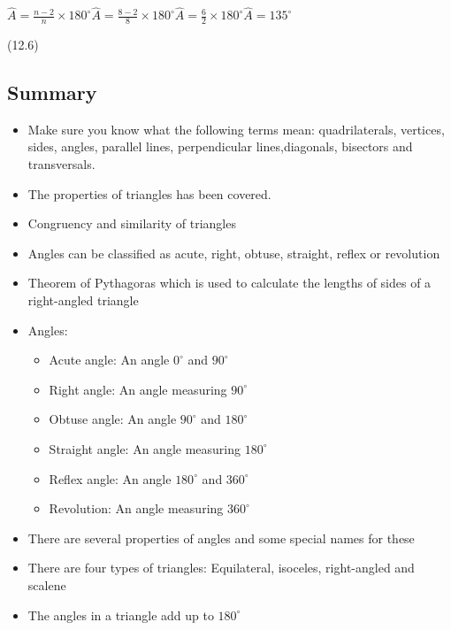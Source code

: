{\begin{mdframed}[linewidth=4, leftmargin=40, rightmargin=40]
\begin{exercise}
\begin{enumerate}[noitemsep, label=\textbf{Step} \textbf{\arabic*}. ]
{\begin{minipage}{\columnwidth}
    \parbox[t]{\mymathboxwidth}{\large$
    \hat{A}=\frac{n-2}{n}\ensuremath{\times}{180}^{\circ }\hat{A}=\frac{8-2}{8}\ensuremath{\times}{180}^{\circ }\hat{A}=\frac{6}{2}\ensuremath{\times}{180}^{\circ }\hat{A}={135}^{\circ }$}\hfill
    \parbox[t]{48pt}{\raggedleft 
    (12.6)}
    \end{minipage}\vspace{12pt}\par
    }%
\end{enumerate}
    \end{exercise}
    \end{mdframed}
    }
    \noindent
    \label{m39368*eip-514}
            \subsection{ Summary}
            \nopagebreak
            \label{m39368*eip-439}\begin{itemize}[noitemsep]
            \item Make sure you know what the following terms mean: quadrilaterals, vertices, sides, angles, parallel lines, perpendicular lines,diagonals, bisectors and transversals.\item The properties of triangles has been covered.\item Congruency and similarity of triangles\item Angles can be classified as acute, right, obtuse, straight, reflex or revolution\item Theorem of Pythagoras which is used to calculate the lengths of sides of a right-angled triangle\item Angles: \label{m39368*id98732}\begin{itemize}[noitemsep]
            \item Acute angle: An angle ${0}^{\circ }$ and ${90}^{\circ }$\item Right angle: An angle measuring ${90}^{\circ }$\item Obtuse angle: An angle ${90}^{\circ }$ and ${180}^{\circ }$\item Straight angle: An angle measuring ${180}^{\circ }$\item Reflex angle: An angle ${180}^{\circ }$ and ${360}^{\circ }$\item Revolution: An angle measuring ${360}^{\circ }$\end{itemize}
        \item There are several properties of angles and some special names for these\item There are four types of triangles: Equilateral, isoceles, right-angled and scalene\item The angles in a triangle add up to ${180}^{\circ }$\end{itemize}
        \label{m39368*cid6}

